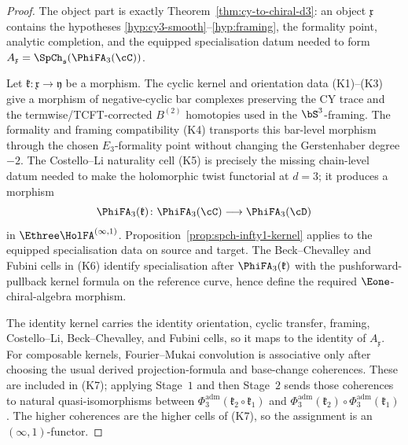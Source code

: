 \begin{proof}
The object part is exactly Theorem~\ref{thm:cy-to-chiral-d3}: an
object $\mathfrak x$ contains the hypotheses \textup{\ref{hyp:cy3-smooth}--\ref{hyp:framing}},
the formality point, analytic completion, and the equipped
specialisation datum needed to form
$A_{\mathfrak x}=\SpCh_{\mathfrak s}(\PhiFA_3(\cC))$.

Let $\mathfrak k\colon\mathfrak x\to\mathfrak y$ be a morphism. The
cyclic kernel and orientation data \textup{(K1)--(K3)} give a morphism
	of negative-cyclic bar complexes preserving the CY trace and the
	termwise/TCFT-corrected $B^{(2)}$ homotopies used in the
	$\bS^3$-framing. The formality and
framing compatibility \textup{(K4)} transports this bar-level morphism
through the chosen $E_3$-formality point without changing the
Gerstenhaber degree $-2$. The Costello--Li naturality cell
\textup{(K5)} is precisely the missing chain-level datum needed to make
the holomorphic twist functorial at $d=3$; it produces a morphism
\[
 \PhiFA_3(\mathfrak k)\colon
 \PhiFA_3(\cC)\longrightarrow\PhiFA_3(\cD)
\]
in $\Ethree\HolFA^{(\infty,1)}$.
Proposition~\ref{prop:spch-infty1-kernel} applies to the equipped
specialisation data on source and target. The Beck--Chevalley and
Fubini cells in \textup{(K6)} identify specialisation after
$\PhiFA_3(\mathfrak k)$ with the pushforward-pullback kernel formula on
the reference curve, hence define the required
$\Eone$-chiral-algebra morphism.

The identity kernel carries the identity orientation, cyclic transfer,
framing, Costello--Li, Beck--Chevalley, and Fubini cells, so it maps to
the identity of $A_{\mathfrak x}$. For composable kernels,
Fourier--Mukai convolution is associative only after choosing the usual
derived projection-formula and base-change coherences. These are
included in \textup{(K7)}; applying Stage~$1$ and then Stage~$2$ sends
those coherences to natural quasi-isomorphisms between
$\Phi_3^{\mathrm{adm}}(\mathfrak k_2\circ\mathfrak k_1)$ and
$\Phi_3^{\mathrm{adm}}(\mathfrak k_2)\circ
\Phi_3^{\mathrm{adm}}(\mathfrak k_1)$. The higher coherences are the
higher cells of \textup{(K7)}, so the assignment is an
$(\infty,1)$-functor.
\end{proof}

